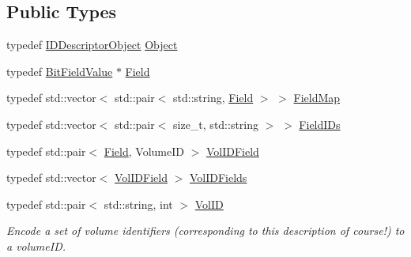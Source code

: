 \subsection*{Public Types}
\begin{DoxyCompactItemize}
\item 
typedef \hyperlink{class_d_d4hep_1_1_geometry_1_1_i_d_descriptor_object}{I\+D\+Descriptor\+Object} \hyperlink{class_d_d4hep_1_1_geometry_1_1_i_d_descriptor_a798e1c3f32519c2161daa79a7c842279}{Object}
\item 
typedef \hyperlink{class_d_d4hep_1_1_d_d_segmentation_1_1_bit_field_value}{Bit\+Field\+Value} $\ast$ \hyperlink{class_d_d4hep_1_1_geometry_1_1_i_d_descriptor_ac06f5915e74f8a8f2ff73e9a322556e4}{Field}
\item 
typedef std\+::vector$<$ std\+::pair$<$ std\+::string, \hyperlink{class_d_d4hep_1_1_geometry_1_1_i_d_descriptor_ac06f5915e74f8a8f2ff73e9a322556e4}{Field} $>$ $>$ \hyperlink{class_d_d4hep_1_1_geometry_1_1_i_d_descriptor_ac9d6740c50e0c5cf495486c55e5640d4}{Field\+Map}
\item 
typedef std\+::vector$<$ std\+::pair$<$ size\+\_\+t, std\+::string $>$ $>$ \hyperlink{class_d_d4hep_1_1_geometry_1_1_i_d_descriptor_a0ced4a2fe6dd5775becad359f39a9ee2}{Field\+I\+Ds}
\item 
typedef std\+::pair$<$ \hyperlink{class_d_d4hep_1_1_geometry_1_1_i_d_descriptor_ac06f5915e74f8a8f2ff73e9a322556e4}{Field}, Volume\+ID $>$ \hyperlink{class_d_d4hep_1_1_geometry_1_1_i_d_descriptor_a29eabc3d9c0c0cfdc01c18e915114a71}{Vol\+I\+D\+Field}
\item 
typedef std\+::vector$<$ \hyperlink{class_d_d4hep_1_1_geometry_1_1_i_d_descriptor_a29eabc3d9c0c0cfdc01c18e915114a71}{Vol\+I\+D\+Field} $>$ \hyperlink{class_d_d4hep_1_1_geometry_1_1_i_d_descriptor_a6c4700a96f3a202eedaa25e54d5695ff}{Vol\+I\+D\+Fields}
\item 
typedef std\+::pair$<$ std\+::string, int $>$ \hyperlink{class_d_d4hep_1_1_geometry_1_1_i_d_descriptor_a6928b7adb965c1c276f22f62a0633750}{Vol\+ID}
\begin{DoxyCompactList}\small\item\em Encode a set of volume identifiers (corresponding to this description of course!) to a volume\+ID. \end{DoxyCompactList}\end{DoxyCompactItemize}
